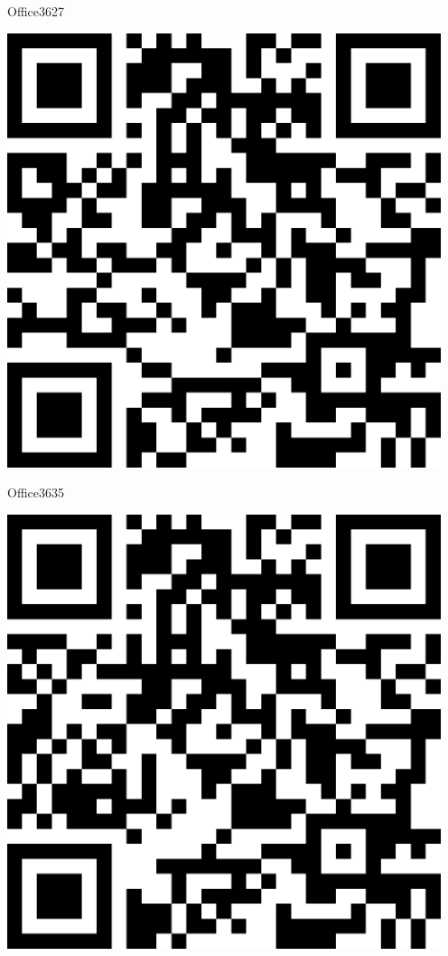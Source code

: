 \documentclass[letterpaper]{article}
\begin{document}
 \hfill{\small Office3627} 

 \vspace{1in} 
 \pagebreak 
{} 
 \vspace*{\fill} 
 \begingroup 
 \centerline{\includegraphics[scale=1,width=5in,height=5in]{Office3635.png}} 
 \endgroup 
 \vspace*{\fill} 

 \hfill{\small Office3635} 

 \vspace{1in} 
 \pagebreak 
{} 
 \vspace*{\fill} 
 \begingroup 
 \centerline{\includegraphics[scale=1,width=5in,height=5in]{Office3637.png}} 
 \endgroup 
 \vspace*{\fill} 
\end{document}
